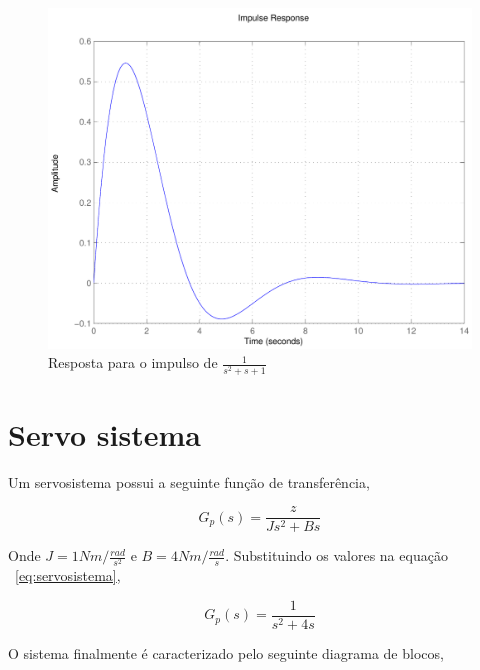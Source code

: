 \documentclass[paper=a4, fontsize=11pt]{article}
\begin{document}
\begin{figure}[!h]
    \begin{center}
    \includegraphics[scale=.5]{q3ia.pdf}
    \caption{Resposta para o impulso de $\frac{1}{s^2+s+1}$}
    \end{center}
\end{figure}


\section{Servo sistema}

Um servosistema possui a seguinte função de transferência,

\begin{equation} \label{eq:servosistema}
    G_p(s) = \frac{z}{J s^2 + B s}
\end{equation}

Onde $J=1 Nm/\frac{rad}{s^2}$ e $B = 4 Nm/\frac{rad}{s}$. Substituindo  os
valores na equação ~\ref{eq:servosistema},

\begin{equation} \label{eq:servosistema}
    G_p(s) = \frac{1}{s^2 + 4 s}
\end{equation}

O sistema finalmente é caracterizado pelo seguinte diagrama de blocos,

\begin{center}
\end{center}
\end{document}
